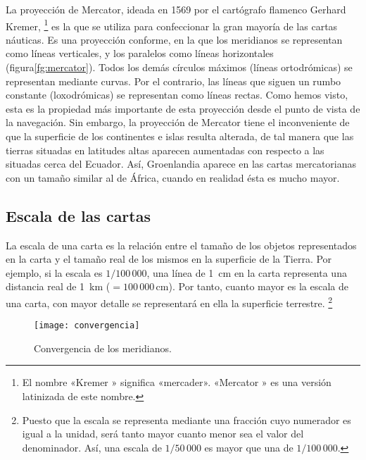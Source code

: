 La proyección de Mercator, ideada en 1569 por el cartógrafo flamenco Gerhard Kremer,%
\footnote{El nombre «Kremer » significa «mercader». «Mercator » es una versión latinizada de este 
nombre.}
 es la que se utiliza para confeccionar la gran mayoría de las cartas náuticas. Es una 
proyección conforme, en la que los meridianos se representan como líneas verticales, y 
los paralelos como líneas horizontales (figura\ref{fg:mercator}). Todos los demás círculos máximos 
(líneas ortodrómicas) se representan mediante curvas. Por el contrario, las líneas que 
siguen un rumbo constante (loxodrómicas) se representan como líneas rectas. Como 
hemos visto, esta es la propiedad más importante de esta proyección desde el punto de 
vista de la navegación. Sin embargo, la proyección de Mercator tiene el inconveniente de 
que la superficie de los continentes e islas resulta alterada, de tal manera que las 
tierras situadas en latitudes altas aparecen aumentadas con respecto a las situadas cerca del 
Ecuador. Así, Groenlandia aparece en las cartas mercatorianas con un tamaño similar al de 
África, cuando en realidad ésta es mucho mayor. 

\subsection{Escala de las cartas }


La escala de una carta es la relación entre el tamaño de los objetos representados en la 
carta y el tamaño real de los mismos en la superficie de la Tierra. Por ejemplo, si la escala 
es $1/100\,000$, una línea de 1~cm en la carta representa una distancia real de 1~km 
($=100\,000\,\mbox{cm}$). Por tanto, cuanto mayor es la escala de una carta, con mayor detalle se 
representará en ella la superficie terrestre.%
\footnote{Puesto que la escala se representa mediante una fracción cuyo numerador es igual a la unidad, 
será tanto mayor cuanto menor sea el valor del denominador. Así, una escala de $1/50\,000$ es 
mayor que una de $1/100\,000$. }

\begin{figure}[hbtp]
\begin{center}
\texttt{[image: convergencia]}\\
\caption{Convergencia de los meridianos.}
\label{fg:convergencia}
\end{center}
\end{figure}

